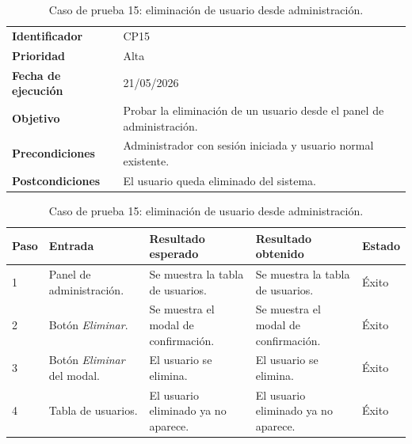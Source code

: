 \begin{table}[]
	\centering
	\footnotesize
	\renewcommand{\arraystretch}{1.2}
	\begin{tabularx}{\textwidth}{p{3.2cm} X}
		\toprule
		\textbf{Identificador} & CP15 \\
		\textbf{Prioridad} & Alta \\
		\textbf{Fecha de ejecución} & 21/05/2026 \\
		\textbf{Objetivo} & Probar la eliminación de un usuario desde el panel de administración. \\
		\textbf{Precondiciones} & Administrador con sesión iniciada y usuario normal existente. \\
		\textbf{Postcondiciones} & El usuario queda eliminado del sistema. \\
		\midrule
	\end{tabularx}
	\begin{tabularx}{\textwidth}{p{0.8cm} p{3.2cm} X X p{1.3cm}}
		\textbf{Paso} & \textbf{Entrada} & \textbf{Resultado esperado} & \textbf{Resultado obtenido} & \textbf{Estado} \\
		\midrule
		1 & Panel de administración. & Se muestra la tabla de usuarios. & Se muestra la tabla de usuarios. & Éxito \\
		2 & Botón \textit{Eliminar}. & Se muestra el modal de confirmación. & Se muestra el modal de confirmación. & Éxito \\
		3 & Botón \textit{Eliminar} del modal. & El usuario se elimina. & El usuario se elimina. & Éxito \\
		4 & Tabla de usuarios. & El usuario eliminado ya no aparece. & El usuario eliminado ya no aparece. & Éxito \\
		\bottomrule
	\end{tabularx}
	\caption{Caso de prueba 15: eliminación de usuario desde administración.}
	\label{tab:cp15}
\end{table}


